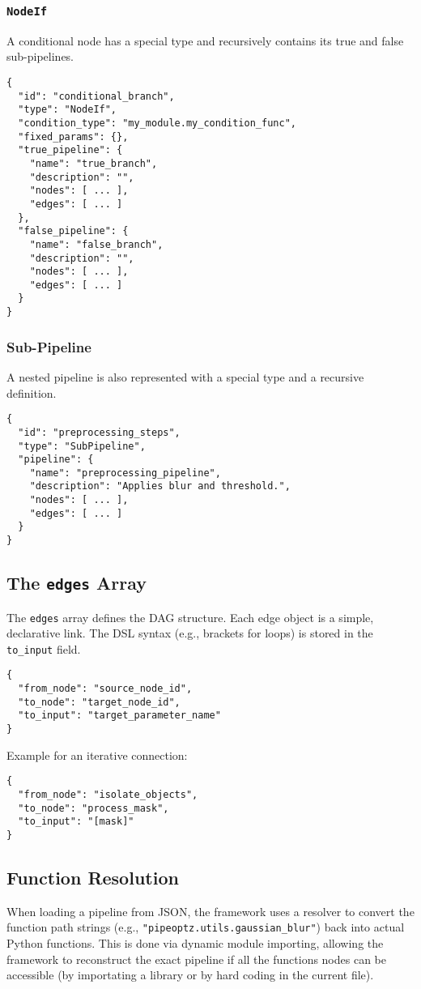 \documentclass[12pt]{article}
\begin{document}
\subsubsection{\texttt{NodeIf}}
A conditional node has a special type and recursively contains its true and false sub-pipelines.
\begin{lstlisting}[caption={JSON for a NodeIf}]
{
  "id": "conditional_branch",
  "type": "NodeIf",
  "condition_type": "my_module.my_condition_func",
  "fixed_params": {},
  "true_pipeline": {
    "name": "true_branch",
    "description": "",
    "nodes": [ ... ],
    "edges": [ ... ]
  },
  "false_pipeline": {
    "name": "false_branch",
    "description": "",
    "nodes": [ ... ],
    "edges": [ ... ]
  }
}
\end{lstlisting}

\subsubsection{Sub-Pipeline}
A nested pipeline is also represented with a special type and a recursive definition.
\begin{lstlisting}[caption={JSON for a Sub-Pipeline}]
{
  "id": "preprocessing_steps",
  "type": "SubPipeline",
  "pipeline": {
    "name": "preprocessing_pipeline",
    "description": "Applies blur and threshold.",
    "nodes": [ ... ],
    "edges": [ ... ]
  }
}
\end{lstlisting}

\subsection{The \texttt{edges} Array}
The \texttt{edges} array defines the DAG structure. Each edge object is a simple, declarative link. The DSL syntax (e.g., brackets for loops) is stored in the \texttt{to\_input} field.

\begin{lstlisting}[caption={JSON for an Edge}]
{
  "from_node": "source_node_id",
  "to_node": "target_node_id",
  "to_input": "target_parameter_name"
}
\end{lstlisting}

Example for an iterative connection:
\begin{lstlisting}[caption={JSON for an Iterative Edge}]
{
  "from_node": "isolate_objects",
  "to_node": "process_mask",
  "to_input": "[mask]"
}
\end{lstlisting}

\subsection{Function Resolution}
When loading a pipeline from JSON, the framework uses a resolver to convert the function path strings (e.g., \texttt{"pipeoptz.utils.gaussian\_blur"}) back into actual Python functions. This is done via dynamic module importing, allowing the framework to reconstruct the exact pipeline if all the functions nodes can be accessible (by importating a library or by hard coding in the current file).
\end{document}
